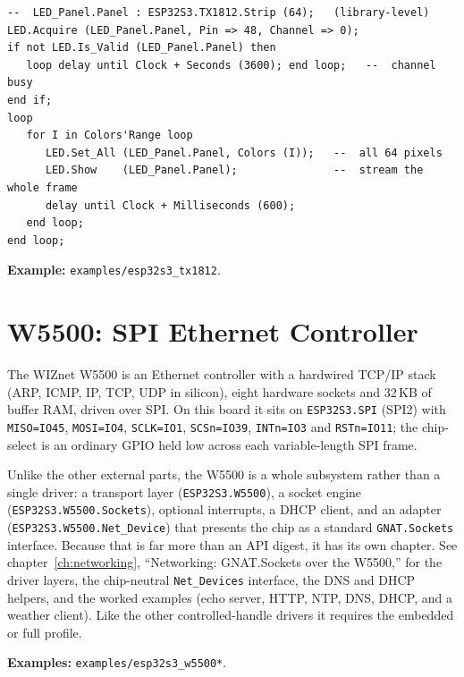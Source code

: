 \begin{lstlisting}
--  LED_Panel.Panel : ESP32S3.TX1812.Strip (64);   (library-level)
LED.Acquire (LED_Panel.Panel, Pin => 48, Channel => 0);
if not LED.Is_Valid (LED_Panel.Panel) then
   loop delay until Clock + Seconds (3600); end loop;   --  channel busy
end if;
loop
   for I in Colors'Range loop
      LED.Set_All (LED_Panel.Panel, Colors (I));   --  all 64 pixels
      LED.Show    (LED_Panel.Panel);               --  stream the whole frame
      delay until Clock + Milliseconds (600);
   end loop;
end loop;
\end{lstlisting}

\noindent\textbf{Example:} \texttt{examples/esp32s3\_tx1812}.

\section{W5500: SPI Ethernet Controller}
\label{app:ext:w5500}

The WIZnet W5500 is an Ethernet controller with a hardwired TCP/IP stack (ARP,
ICMP, IP, TCP, UDP in silicon), eight hardware sockets and 32\,KB of buffer RAM,
driven over SPI. On this board it sits on \texttt{ESP32S3.SPI} (SPI2) with
\texttt{MISO=IO45}, \texttt{MOSI=IO4}, \texttt{SCLK=IO1}, \texttt{SCSn=IO39},
\texttt{INTn=IO3} and \texttt{RSTn=IO11}; the chip-select is an ordinary GPIO held
low across each variable-length SPI frame.

Unlike the other external parts, the W5500 is a whole subsystem rather than a single
driver: a transport layer (\texttt{ESP32S3.W5500}), a socket engine
(\texttt{ESP32S3.W5500.Sockets}), optional interrupts, a DHCP client, and an adapter
(\texttt{ESP32S3.W5500.Net\_Device}) that presents the chip as a standard
\texttt{GNAT.Sockets} interface. Because that is far more than an API digest, it has
its own chapter. See chapter~\ref{ch:networking}, ``Networking: GNAT.Sockets over
the W5500,'' for the driver layers, the chip-neutral \texttt{Net\_Devices}
interface, the DNS and DHCP helpers, and the worked examples (echo server, HTTP,
NTP, DNS, DHCP, and a weather client). Like the other controlled-handle drivers it
requires the embedded or full profile.

\noindent\textbf{Examples:} \texttt{examples/esp32s3\_w5500*}.
